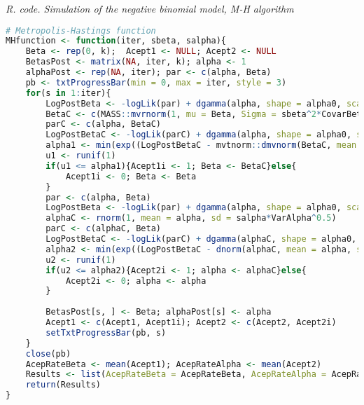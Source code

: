 \begin{tcolorbox}[enhanced,width=4.67in,center upper,
	fontupper=\large\bfseries,drop shadow southwest,sharp corners]
	\textit{R. code. Simulation of the negative binomial model, M-H algorithm}
	\begin{VF}
		\begin{lstlisting}[language=R]
# Metropolis-Hastings function 
MHfunction <- function(iter, sbeta, salpha){
	Beta <- rep(0, k); 	Acept1 <- NULL; Acept2 <- NULL
	BetasPost <- matrix(NA, iter, k); alpha <- 1
	alphaPost <- rep(NA, iter); par <- c(alpha, Beta)
	pb <- txtProgressBar(min = 0, max = iter, style = 3)
	for(s in 1:iter){
		LogPostBeta <- -logLik(par) + dgamma(alpha, shape = alpha0, scale = delta0, log = TRUE) + mvtnorm::dmvnorm(Beta, mean = b0, sigma = B0, log = TRUE)
		BetaC <- c(MASS::mvrnorm(1, mu = Beta, Sigma = sbeta^2*CovarBetas))
		parC <- c(alpha, BetaC)
		LogPostBetaC <- -logLik(parC) + dgamma(alpha, shape = alpha0, scale = delta0, log = TRUE) +  mvtnorm::dmvnorm(BetaC, mean = b0, sigma = B0, log = TRUE)
		alpha1 <- min(exp((LogPostBetaC - mvtnorm::dmvnorm(BetaC, mean = Beta, sigma = sbeta^2*CovarBetas, log = TRUE))-(LogPostBeta - mvtnorm::dmvnorm(Beta, mean = Beta, sigma = sbeta^2*CovarBetas, log = TRUE))),1)
		u1 <- runif(1)
		if(u1 <= alpha1){Acept1i <- 1; Beta <- BetaC}else{
			Acept1i <- 0; Beta <- Beta
		}
		par <- c(alpha, Beta)
		LogPostBeta <- -logLik(par) + dgamma(alpha, shape = alpha0, scale = delta0, log = TRUE) + mvtnorm::dmvnorm(Beta, mean = b0, sigma = B0, log = TRUE)
		alphaC <- rnorm(1, mean = alpha, sd = salpha*VarAlpha^0.5)
		parC <- c(alphaC, Beta)
		LogPostBetaC <- -logLik(parC) + dgamma(alphaC, shape = alpha0, scale = delta0, log = TRUE) +  mvtnorm::dmvnorm(Beta, mean = b0, sigma = B0, log = TRUE)
		alpha2 <- min(exp((LogPostBetaC - dnorm(alphaC, mean = alpha, sd = salpha*VarAlpha^0.5, log = TRUE))-(LogPostBeta - dnorm(alpha, mean = alpha, sd = salpha*VarAlpha^0.5, log = TRUE))),1)
		u2 <- runif(1)
		if(u2 <= alpha2){Acept2i <- 1; alpha <- alphaC}else{
			Acept2i <- 0; alpha <- alpha
		}
		
		BetasPost[s, ] <- Beta; alphaPost[s] <- alpha
		Acept1 <- c(Acept1, Acept1i); Acept2 <- c(Acept2, Acept2i)
		setTxtProgressBar(pb, s)
	}
	close(pb)
	AcepRateBeta <- mean(Acept1); AcepRateAlpha <- mean(Acept2)
	Results <- list(AcepRateBeta = AcepRateBeta, AcepRateAlpha = AcepRateAlpha, BetasPost = BetasPost, alphaPost = alphaPost)
	return(Results)
}
\end{lstlisting}
	\end{VF}
\end{tcolorbox} 

